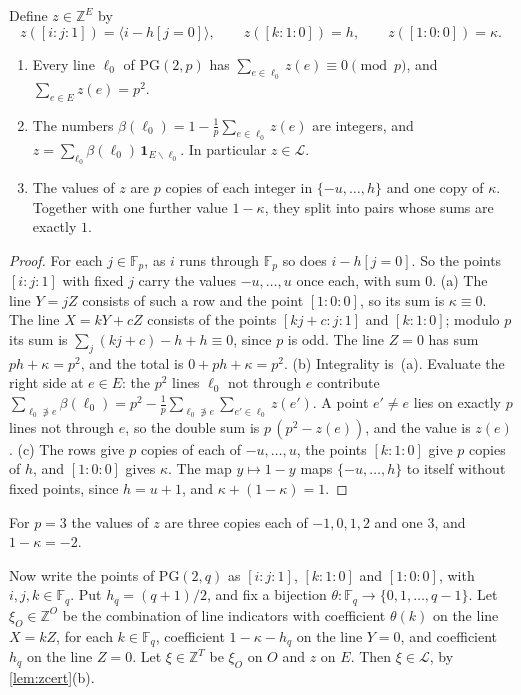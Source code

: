 \documentclass[11pt]{article}
\theoremstyle{definition}
\theoremstyle{plain}
\newcommand{\F}{\mathbb{F}}
\newcommand{\Z}{\mathbb{Z}}
\newcommand{\PG}{\mathrm{PG}}
\newcommand{\one}{\mathbf{1}}
\begin{document}
\begin{lemma}\label{lem:zcert}
Define $z\in\Z^E$ by
\[
z([i:j:1])=\bigl\langle i-h[j=0]\bigr\rangle,\qquad z([k:1:0])=h,\qquad z([1:0:0])=\kappa.
\]
\begin{enumerate}[label=\textup{(\alph*)},itemsep=0pt]
\item Every line $\ell_0$ of $\PG(2,p)$ has $\sum_{e\in\ell_0}z(e)\equiv0\pmod p$, and $\sum_{e\in E}z(e)=p^2$.
\item The numbers $\beta(\ell_0)=1-\frac1p\sum_{e\in\ell_0}z(e)$ are integers, and $z=\sum_{\ell_0}\beta(\ell_0)\,\one_{E\smallsetminus\ell_0}$. In particular $z\in\mathcal L$.
\item The values of $z$ are $p$ copies of each integer in $\{-u,\dots,h\}$ and one copy of $\kappa$. Together with one further value $1-\kappa$, they split into pairs whose sums are exactly $1$.
\end{enumerate}
\end{lemma}

\begin{proof}
For each $j\in\F_p$, as $i$ runs through $\F_p$ so does $i-h[j=0]$. So the points $[i:j:1]$ with fixed $j$ carry the values $-u,\dots,u$ once each, with sum $0$. (a) The line $Y=jZ$ consists of such a row and the point $[1:0:0]$, so its sum is $\kappa\equiv0$. The line $X=kY+cZ$ consists of the points $[kj+c:j:1]$ and $[k:1:0]$; modulo $p$ its sum is $\sum_j(kj+c)-h+h\equiv0$, since $p$ is odd. The line $Z=0$ has sum $ph+\kappa=p^2$, and the total is $0+ph+\kappa=p^2$. (b) Integrality is~(a). Evaluate the right side at $e\in E$: the $p^2$ lines $\ell_0$ not through $e$ contribute $\sum_{\ell_0\not\ni e}\beta(\ell_0)=p^2-\frac1p\sum_{\ell_0\not\ni e}\sum_{e'\in\ell_0}z(e')$. A point $e'\neq e$ lies on exactly $p$ lines not through $e$, so the double sum is $p\,(p^2-z(e))$, and the value is $z(e)$. (c) The rows give $p$ copies of each of $-u,\dots,u$, the points $[k:1:0]$ give $p$ copies of $h$, and $[1:0:0]$ gives $\kappa$. The map $y\mapsto1-y$ maps $\{-u,\dots,h\}$ to itself without fixed points, since $h=u+1$, and $\kappa+(1-\kappa)=1$.
\end{proof}

For $p=3$ the values of $z$ are three copies each of $-1,0,1,2$ and one $3$, and $1-\kappa=-2$.

Now write the points of $\PG(2,q)$ as $[i:j:1]$, $[k:1:0]$ and $[1:0:0]$, with $i,j,k\in\F_q$. Put $h_q=(q+1)/2$, and fix a bijection $\theta\colon\F_q\to\{0,1,\dots,q-1\}$. Let $\xi_O\in\Z^O$ be the combination of line indicators with coefficient $\theta(k)$ on the line $X=kZ$, for each $k\in\F_q$, coefficient $1-\kappa-h_q$ on the line $Y=0$, and coefficient $h_q$ on the line $Z=0$. Let $\xi\in\Z^T$ be $\xi_O$ on $O$ and $z$ on $E$. Then $\xi\in\mathcal L$, by \cref{lem:zcert}(b).
\end{document}
